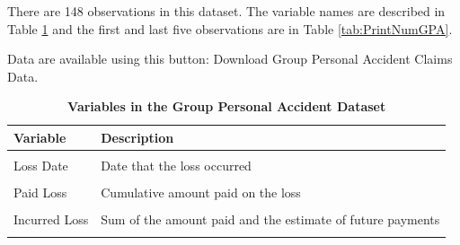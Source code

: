 \documentclass[
  12pt,
  krantz2]{Format/krantzNoCorner}
\begin{document}
There are 148 observations in this dataset. The variable names are described in Table \ref{tab:DescribeGPA} and the first and last five observations are in Table \ref{tab:PrintNumGPA}.

Data are available using this button: Download Group Personal Accident Claims Data.

\begin{table}[!h]
\centering\centering
\caption{\label{tab:DescribeGPA}\textbf{Variables in the Group Personal Accident Dataset}}
\centering
\fontsize{10}{12}\selectfont
\begin{tabular}[t]{>{}l>{\raggedright\arraybackslash}p{12cm}}
\toprule
Variable & Description\\
\midrule
\cellcolor{gray!10}{UW Year} & \cellcolor{gray!10}{Underwriting Year}\\
Loss Date & Date that the loss occurred\\
\cellcolor{gray!10}{Last Trans Date} & \cellcolor{gray!10}{Last date in which there was a transaction regarding the loss.}\\
Paid Loss & Cumulative amount paid on the loss\\
\cellcolor{gray!10}{Outstanding Reserve} & \cellcolor{gray!10}{Estimate of the loss amount yet to be paid}\\
\addlinespace
Incurred Loss & Sum of the amount paid and the estimate of future payments\\
\cellcolor{gray!10}{Status} & \cellcolor{gray!10}{An indicator as to whether the claim has been deemed settled (closed) or not settled (open)}\\
\bottomrule
\end{tabular}
\end{table}
\end{document}

